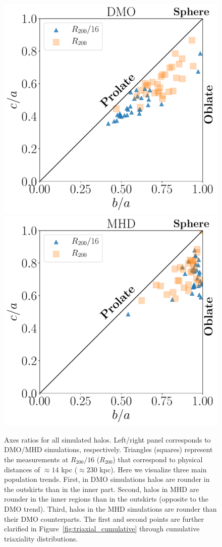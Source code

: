 \documentclass[usenatbib]{mnras}
\begin{document}
 
\begin{figure}
\begin{center}
\includegraphics[width=0.8\columnwidth]{Lvl_4_Triax_Plane_DM.pdf}
\includegraphics[width=0.8\columnwidth]{Lvl_4_Triax_Plane_MHD.pdf}
\end{center}
\caption{Axes ratios for all simulated halos.
  Left/right panel corresponds to DMO/MHD simulations, respectively.
  Triangles (squares) represent the measurements at $R_{200}/16$
  ($R_{200}$) that correspond to physical distances of $\approx14$ kpc
  ($\approx 230$ kpc).
  Here we visualize three main population trends.
  First, in DMO simulations halos are rounder in the outskirts
  than in the inner part.
  Second, halos in MHD are rounder in the inner regions than in
  the outskirts (opposite to the DMO trend). 
  Third, halos in the MHD simulations are rounder than their DMO counterparts.
  The first and second points are further 
  clarified in Figure~\ref{fig:triaxial_cumulative} through cumulative triaxiality
  distributions.}
  \label{fig:triaxiality_plane}
\end{figure}
\end{document}
